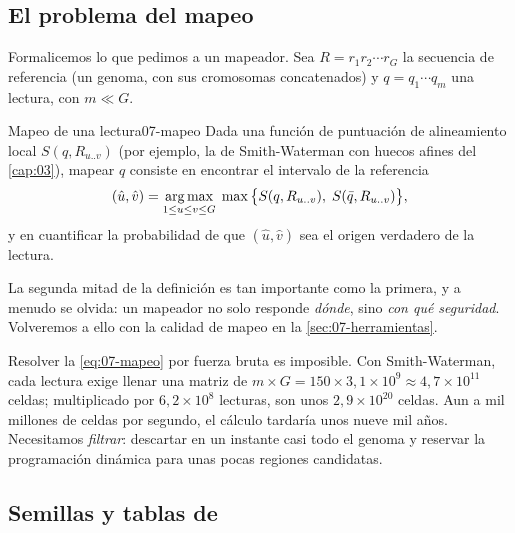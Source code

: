\subsection{El problema del mapeo}

Formalicemos lo que pedimos a un mapeador. Sea $R=r_1r_2\cdots r_G$ la secuencia de referencia (un genoma, con sus cromosomas concatenados) y $q=q_1\cdots q_m$ una lectura, con $m\ll G$.

\begin{definicion}{Mapeo de una lectura}{07-mapeo}
Dada una función de puntuación de alineamiento local $S(q, R_{u..v})$ (por ejemplo, la de Smith-Waterman con huecos afines del \cref{cap:03}), mapear $q$ consiste en encontrar el intervalo de la referencia
\begin{equation}\label{eq:07-mapeo}
(\hat u,\hat v) = \operatorname*{arg\,max}_{1\le u\le v\le G}\; \max\big\{S(q, R_{u..v}),\; S(\bar q, R_{u..v})\big\},
\end{equation}
y en cuantificar la probabilidad de que $(\hat u,\hat v)$ sea el origen verdadero de la lectura.
\end{definicion}

\begin{simbolos}
\end{simbolos}

La segunda mitad de la definición es tan importante como la primera, y a menudo se olvida: un mapeador no solo responde \emph{dónde}, sino \emph{con qué seguridad}. Volveremos a ello con la calidad de mapeo en la \cref{sec:07-herramientas}.

Resolver la \cref{eq:07-mapeo} por fuerza bruta es imposible. Con Smith-Waterman, cada lectura exige llenar una matriz de $m\times G = 150\times 3{,}1\times10^9\approx 4{,}7\times10^{11}$ celdas; multiplicado por $6{,}2\times10^8$ lecturas, son unos $2{,}9\times10^{20}$ celdas. Aun a mil millones de celdas por segundo, el cálculo tardaría unos nueve mil años. Necesitamos \emph{filtrar}: descartar en un instante casi todo el genoma y reservar la programación dinámica para unas pocas regiones candidatas.

\subsection{Semillas y tablas de }

